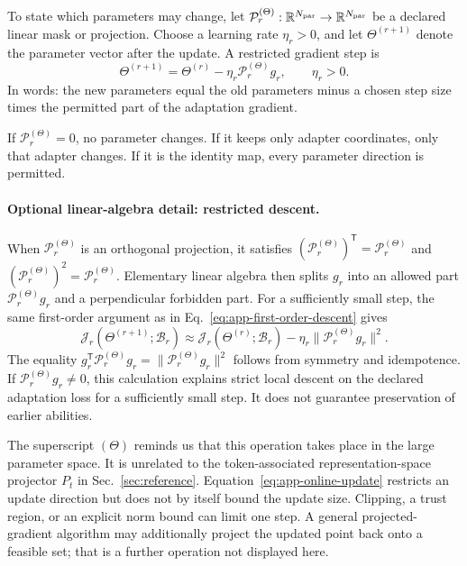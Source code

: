 \documentclass[
  aps,
  reprint,
  superscriptaddress,
  floatfix,
  nofootinbib,
  longbibliography
]{revtex4-2}
\newcommand{\R}{\mathbb{R}}
\newcommand{\T}{^{\mathsf{T}}}
\newcommand{\norm}[1]{\lVert #1 \rVert}
\begin{document}
To state which parameters may change, let
$\mathcal P_r^{(\Theta)}:\R^{N_{\rm par}}\to\R^{N_{\rm par}}$ be a declared
linear mask or projection.  Choose a learning rate $\eta_r>0$, and let
$\Theta^{(r+1)}$ denote the parameter vector after the update.  A restricted
gradient step is
\begin{equation}
\label{eq:app-online-update}
\Theta^{(r+1)}
=\Theta^{(r)}-\eta_r\mathcal P_r^{(\Theta)}g_r,
\qquad \eta_r>0.
\end{equation}
In words: the new parameters equal the old parameters minus a chosen step size
times the permitted part of the adaptation gradient.

If $\mathcal P_r^{(\Theta)}=0$, no parameter changes.  If it keeps only adapter
coordinates, only that adapter changes.  If it is the identity map, every
parameter direction is permitted.

\paragraph{Optional linear-algebra detail: restricted descent.}
When $\mathcal P_r^{(\Theta)}$ is an orthogonal projection, it satisfies
$(\mathcal P_r^{(\Theta)})\T=\mathcal P_r^{(\Theta)}$ and
$(\mathcal P_r^{(\Theta)})^2=\mathcal P_r^{(\Theta)}$.  Elementary linear
algebra then splits $g_r$ into an allowed part
$\mathcal P_r^{(\Theta)}g_r$ and a perpendicular forbidden part.  For a
sufficiently small step, the same first-order argument as in
Eq.~\eqref{eq:app-first-order-descent} gives
\begin{equation}
\label{eq:app-restricted-descent}
\mathcal J_r(\Theta^{(r+1)};\mathcal B_r)
\approx
\mathcal J_r(\Theta^{(r)};\mathcal B_r)
-\eta_r\norm{\mathcal P_r^{(\Theta)}g_r}^{2}.
\end{equation}
The equality $g_r\T\mathcal P_r^{(\Theta)}g_r
=\norm{\mathcal P_r^{(\Theta)}g_r}^{2}$ follows from symmetry and
idempotence.  If $\mathcal P_r^{(\Theta)}g_r\ne0$, this calculation explains
strict local descent on the declared adaptation loss for a sufficiently small
step.  It does not guarantee preservation of earlier abilities.

The superscript $(\Theta)$ reminds us that this operation takes place in the
large parameter space.  It is unrelated to the token-associated
representation-space projector $P_t$ in
Sec.~\ref{sec:reference}.  Equation~\eqref{eq:app-online-update} restricts an
update direction but does not by itself bound the update size.  Clipping, a
trust region, or an explicit norm bound can limit one step.  A general
projected-gradient algorithm may additionally project the updated point back
onto a feasible set; that is a further operation not displayed here.
\end{document}
